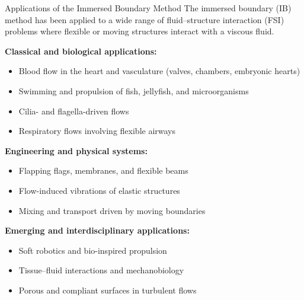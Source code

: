 \documentclass{beamer}
\begin{document}
\begin{frame}{Applications of the Immersed Boundary Method}
\footnotesize
The immersed boundary (IB) method has been applied to a wide range of
fluid--structure interaction (FSI) problems where flexible or moving
structures interact with a viscous fluid.

\medskip
\textbf{Classical and biological applications:}
\begin{itemize}
    \item Blood flow in the heart and vasculature (valves, chambers, embryonic hearts)
    \item Swimming and propulsion of fish, jellyfish, and microorganisms
    \item Cilia- and flagella-driven flows
    \item Respiratory flows involving flexible airways
\end{itemize}

\medskip
\textbf{Engineering and physical systems:}
\begin{itemize}
    \item Flapping flags, membranes, and flexible beams
    \item Flow-induced vibrations of elastic structures
    \item Mixing and transport driven by moving boundaries
\end{itemize}

\medskip
\textbf{Emerging and interdisciplinary applications:}
\begin{itemize}
    \item Soft robotics and bio-inspired propulsion
    \item Tissue--fluid interactions and mechanobiology
    \item Porous and compliant surfaces in turbulent flows
\end{itemize}

\end{frame}
\end{document}

